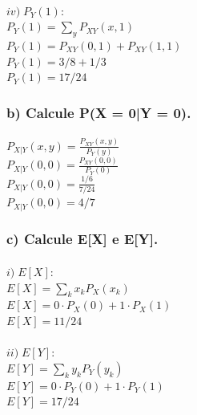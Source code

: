 \documentclass[a4paper]{article}
\begin{document}
\paragraph{$iv) \; P_Y(1):                      $
\\
$ \displaystyle P_Y(1) = \sum_{y} P_{XY}(x,1)   $\\
$ P_Y(1) = P_{XY}(0,1) + P_{XY}(1,1)            $\\
$ P_Y(1) = 3/8 + 1/3                            $\\
$ \boxed{ P_Y(1) = 17/24 }                      $\\
}

\subsubsection{b) Calcule P(X = 0|Y = 0).}
\paragraph{
$ \displaystyle P_{X|Y}(x,y) = \frac{P_{XY}(x,y)}{P_Y(y)}   $\\
$ \displaystyle P_{X|Y}(0,0) = \frac{P_{XY}(0,0)}{P_Y(0)}   $\\
$ P_{X|Y}(0,0) = \frac{1/6}{7/24}                           $\\
$ \boxed{ P_{X|Y}(0,0) = 4/7 }                              $\\
}

\subsubsection{c) Calcule E[X] e E[Y].}

\paragraph{$ i) \; E[X]:                       $
\\
$ \displaystyle E[X] = \sum_{k} x_k P_X(x_k)   $\\
$ E[X] = 0 \cdot P_X(0) + 1 \cdot P_X(1)       $\\
$ \boxed{ E[X] = 11/24 }                       $\\
}
\paragraph{$ ii) \; E[Y]:                      $
\\
$ \displaystyle E[Y] = \sum_{k} y_k P_Y(y_k)   $\\
$ E[Y] = 0 \cdot P_Y(0) + 1 \cdot P_Y(1)       $\\
$ \boxed{ E[Y] = 17/24 }                       $\\
}
\end{document}
